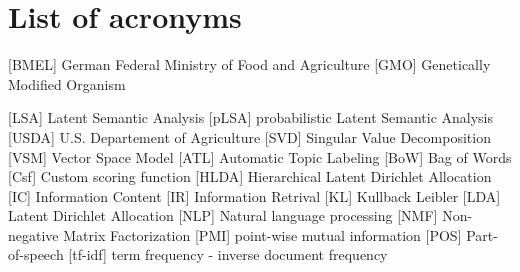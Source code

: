 \section*{List of acronyms}
\begin{acronym}
	\setlength{\parskip}{0ex}
	\setlength{\itemsep}{1ex}
	 [BMEL] {German Federal Ministry of Food and Agriculture}
	 [GMO] {Genetically Modified Organism}
	
		[LSA] {Latent Semantic Analysis}
	 [pLSA] {probabilistic Latent Semantic Analysis}
	 [USDA] {U.S. Departement of Agriculture}
	 [SVD] {Singular Value Decomposition}
	 [VSM] {Vector Space Model}	
	 [ATL] {Automatic Topic Labeling}
	 [BoW] {Bag of Words}
	 [Csf] {Custom scoring function}
	[HLDA] {Hierarchical Latent Dirichlet Allocation}
	 [IC] Information Content
		[IR] {Information Retrival}
		[KL] {Kullback Leibler}
		[LDA] {Latent Dirichlet Allocation}
	 [NLP] {Natural language processing}
	 	[NMF] {Non-negative Matrix Factorization}
	 [PMI] {point-wise mutual information}
	 [POS] {Part-of-speech}
	 [tf-idf] {term frequency - inverse document frequency}
	
\end{acronym}